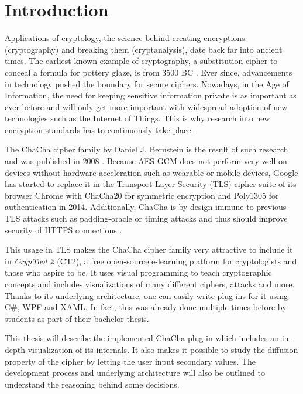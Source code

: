 
\chapter{Introduction}

Applications of cryptology, the science behind creating encryptions (cryptography) and breaking them (cryptanalysis), date back far into ancient times. The earliest known example of  cryptography, a substitution cipher to conceal a formula for pottery glaze, is from 3500 BC \cite{history}. Ever since, advancements in technology pushed the boundary for secure ciphers. Nowadays, in the Age of Information, the need for keeping sensitive information private is as important as ever before and will only get more important with widespread adoption of new technologies such as the Internet of Things. This is why research into new encryption standards has to continuously take place.

The ChaCha cipher family by Daniel J. Bernstein is the result of such research and was published in 2008 \cite{chachaspec}. Because AES-GCM does not perform very well on devices without hardware acceleration such as wearable or mobile devices, Google has started to replace it in the Transport Layer Security (TLS) cipher suite of its browser Chrome with ChaCha20 for symmetric encryption and Poly1305 for authentication in 2014. Additionally, ChaCha is by design immune to previous TLS attacks such as padding-oracle or timing attacks and thus should improve security of HTTPS connections \cite{googlesecurityblog}.

This usage in TLS makes the ChaCha cipher family very attractive to include it in \textit{CrypTool 2} (CT2), a free open-source e-learning platform for cryptologists and those who aspire to be. It uses visual programming to teach cryptographic concepts and includes visualizations of many different ciphers, attacks and more. Thanks to its underlying architecture, one can easily write plug-ins for it using C\#, WPF and XAML. In fact, this was already done multiple times before by students as part of their bachelor thesis.

This thesis will describe the implemented ChaCha plug-in which includes an in-depth visualization of its internals. It also makes it possible to study the diffusion property of the cipher by letting the user input secondary values. The development process and underlying architecture will also be outlined to understand the reasoning behind some decisions.